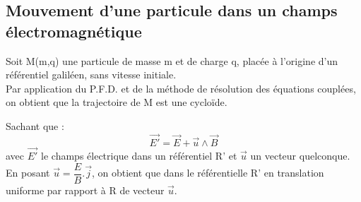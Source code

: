 \subsection{Mouvement d'une particule dans un champs électromagnétique}
\begin{prop}
Soit M(m,q) une particule de masse m et de charge q, placée à l'origine d'un référentiel galiléen, sans vitesse initiale.\\
Par application du P.F.D. et de la méthode de résolution des équations couplées, on obtient que la trajectoire de M est une cycloïde.
\end{prop}
\begin{prop}
Sachant que : 
$$\overrightarrow{E'} = \overrightarrow{E} + \overrightarrow{u}\wedge\overrightarrow{B}$$
avec $\overrightarrow{E'}$ le champs électrique dans un référentiel R' et $\overrightarrow{u}$ un vecteur quelconque.\\
En posant $\overrightarrow{u} = \dfrac{E}{B}.\overrightarrow{j}$, on obtient que dans le référentielle R' en translation uniforme par rapport à R de vecteur $\overrightarrow{u}$.
\end{prop}
